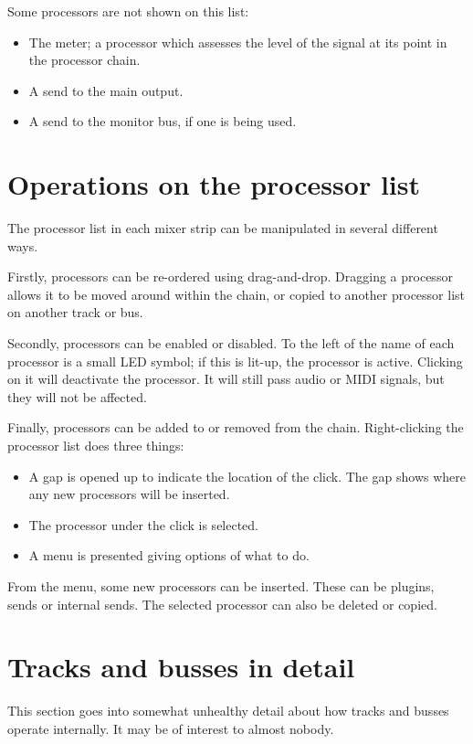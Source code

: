 \documentclass[10pt,a4paper]{book}
\begin{document}
{Some processors are not shown on this list:

\begin{itemize}
\item The meter; a processor which assesses the level of the signal at
  its point in the processor chain.
\item A send to the main output.
\item A send to the monitor bus, if one is being used.
\end{itemize}


\section{Operations on the processor list}

The processor list in each mixer strip can be manipulated in several
different ways.

Firstly, processors can be re-ordered using drag-and-drop.  Dragging a
processor allows it to be moved around within the chain, or copied to
another processor list on another track or bus.

Secondly, processors can be enabled or disabled.  To the left of the
name of each processor is a small LED symbol; if this is lit-up, the
processor is active.  Clicking on it will deactivate the processor.
It will still pass audio or MIDI signals, but they will not be
affected.

Finally, processors can be added to or removed from the chain.
Right-clicking the processor list does three things:

\begin{itemize}
\item A gap is opened up to indicate the location of the click.  The
  gap shows where any new processors will be inserted.
\item The processor under the click is selected.
\item A menu is presented giving options of what to do.
\end{itemize}

From the menu, some new processors can be inserted.  These can be
plugins, sends or internal sends.  The selected processor can also be
deleted or copied.

\section{Tracks and busses in detail}

\begin{ddanger}
This section goes into somewhat unhealthy detail about how tracks and
busses operate internally.  It may be of interest to almost nobody.
\end{ddanger}

}
\end{document}
